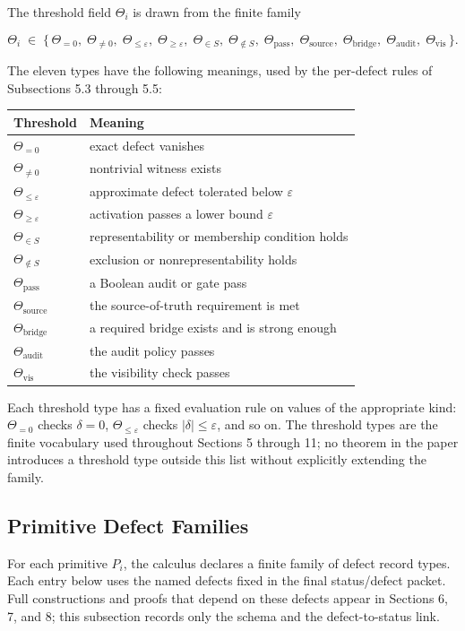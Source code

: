 \documentclass[11pt]{article}
\theoremstyle{definition}
\begin{document}
The threshold field \(\Theta_i\) is drawn from the finite family

\[
\Theta_i\;\in\;\{\,\Theta_{=0},\;\Theta_{\neq0},\;\Theta_{\le\varepsilon},\;\Theta_{\ge\varepsilon},\;\Theta_{\in S},\;\Theta_{\notin S},\;\Theta_{\mathrm{pass}},\;\Theta_{\mathrm{source}},\;\Theta_{\mathrm{bridge}},\;\Theta_{\mathrm{audit}},\;\Theta_{\mathrm{vis}}\,\}.
\]

The eleven types have the following meanings, used by the per-defect rules of Subsections 5.3 through 5.5:

\begin{longtable}[]{@{}ll@{}}
\toprule
Threshold & Meaning\tabularnewline
\midrule
\endhead
\(\Theta_{=0}\) & exact defect vanishes\tabularnewline
\(\Theta_{\neq0}\) & nontrivial witness exists\tabularnewline
\(\Theta_{\le\varepsilon}\) & approximate defect tolerated below \(\varepsilon\)\tabularnewline
\(\Theta_{\ge\varepsilon}\) & activation passes a lower bound \(\varepsilon\)\tabularnewline
\(\Theta_{\in S}\) & representability or membership condition holds\tabularnewline
\(\Theta_{\notin S}\) & exclusion or nonrepresentability holds\tabularnewline
\(\Theta_{\mathrm{pass}}\) & a Boolean audit or gate pass\tabularnewline
\(\Theta_{\mathrm{source}}\) & the source-of-truth requirement is met\tabularnewline
\(\Theta_{\mathrm{bridge}}\) & a required bridge exists and is strong enough\tabularnewline
\(\Theta_{\mathrm{audit}}\) & the audit policy passes\tabularnewline
\(\Theta_{\mathrm{vis}}\) & the visibility check passes\tabularnewline
\bottomrule
\end{longtable}

Each threshold type has a fixed evaluation rule on values of the appropriate kind: \(\Theta_{=0}\) checks \(\delta=0\), \(\Theta_{\le\varepsilon}\) checks \(|\delta|\le\varepsilon\), and so on. The threshold types are the finite vocabulary used throughout Sections 5 through 11; no theorem in the paper introduces a threshold type outside this list without explicitly extending the family.

\subsection{Primitive Defect Families}

For each primitive \(P_i\), the calculus declares a finite family of defect record types. Each entry below uses the named defects fixed in the final status/defect packet. Full constructions and proofs that depend on these defects appear in Sections 6, 7, and 8; this subsection records only the schema and the defect-to-status link.
\end{document}
